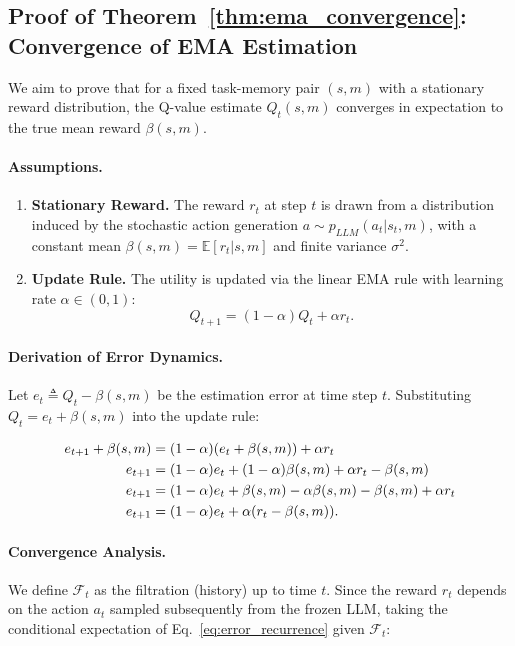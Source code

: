 \documentclass{article}
\theoremstyle{plain}
\theoremstyle{definition}
\theoremstyle{remark}
\begin{document}
\subsection{Proof of Theorem~\ref{thm:ema_convergence}: Convergence of EMA Estimation}
\label{app:proof_convergence}

We aim to prove that for a fixed task-memory pair $(s,m)$ with a stationary reward distribution, the Q-value estimate $Q_t(s,m)$ converges in expectation to the true mean reward $\beta(s,m)$.

\paragraph{Assumptions.}
\begin{enumerate}[leftmargin=*]
    \item \textbf{Stationary Reward.} The reward $r_t$ at step $t$ is drawn from a distribution induced by the stochastic action generation $a \sim p_{LLM}(a_t | s_t, m)$, with a constant mean $\beta(s,m) = \mathbb{E}[r_t | s, m]$ and finite variance $\sigma^2$.
    \item \textbf{Update Rule.} The utility is updated via the linear EMA rule with learning rate $\alpha \in (0,1)$:
    \begin{equation*}
        Q_{t+1} = (1-\alpha)Q_t + \alpha r_t.
    \end{equation*}
\end{enumerate}

\paragraph{Derivation of Error Dynamics.}
Let $e_t \triangleq Q_t - \beta(s,m)$ be the estimation error at time step $t$. Substituting $Q_t = e_t + \beta(s,m)$ into the update rule:

\begin{align}
    e_{t+1} + \beta(s,m) &= (1-\alpha)(e_t + \beta(s,m)) + \alpha r_t \notag \\
    e_{t+1} &= (1-\alpha)e_t + (1-\alpha)\beta(s,m) + \alpha r_t - \beta(s,m) \notag \\
    e_{t+1} &= (1-\alpha)e_t + \beta(s,m) - \alpha\beta(s,m) - \beta(s,m) + \alpha r_t \notag \\
    e_{t+1} &= (1-\alpha)e_t + \alpha (r_t - \beta(s,m)). \label{eq:error_recurrence}
\end{align}

\paragraph{Convergence Analysis.}
We define $\mathcal{F}_t$ as the filtration (history) up to time $t$. Since the reward $r_t$ depends on the action $a_t$ sampled subsequently from the frozen LLM, taking the conditional expectation of Eq.~\ref{eq:error_recurrence} given $\mathcal{F}_t$:
\end{document}
